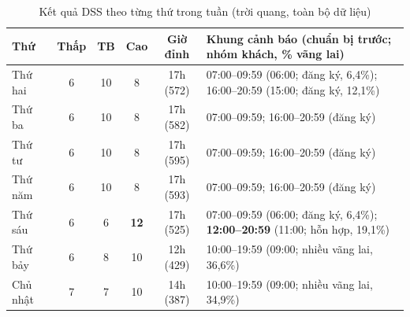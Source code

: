 \begin{table}[H]
\centering
\caption{Kết quả DSS theo từng thứ trong tuần (trời quang, toàn bộ dữ liệu)}
\label{tab:weekdays}
\small
\begin{tabularx}{\textwidth}{|l|c|c|c|c|X|}
\hline
\textbf{Thứ} & \textbf{Thấp} & \textbf{TB} & \textbf{Cao} & \textbf{Giờ đỉnh} & \textbf{Khung cảnh báo (chuẩn bị trước; nhóm khách, \% vãng lai)} \\ \hline
Thứ hai & 6 & 10 & 8 & 17h (572) & 07:00--09:59 (06:00; đăng ký, 6,4\%); 16:00--20:59 (15:00; đăng ký, 12,1\%) \\ \hline
Thứ ba & 6 & 10 & 8 & 17h (582) & 07:00--09:59; 16:00--20:59 (đăng ký) \\ \hline
Thứ tư & 6 & 10 & 8 & 17h (595) & 07:00--09:59; 16:00--20:59 (đăng ký) \\ \hline
Thứ năm & 6 & 10 & 8 & 17h (593) & 07:00--09:59; 16:00--20:59 (đăng ký) \\ \hline
Thứ sáu & 6 & 6 & \textbf{12} & 17h (525) & 07:00--09:59 (06:00; đăng ký, 6,4\%); \textbf{12:00--20:59} (11:00; hỗn hợp, 19,1\%) \\ \hline
Thứ bảy & 6 & 8 & 10 & 12h (429) & 10:00--19:59 (09:00; nhiều vãng lai, 36,6\%) \\ \hline
Chủ nhật & 7 & 7 & 10 & 14h (387) & 10:00--19:59 (09:00; nhiều vãng lai, 34,9\%) \\ \hline
\end{tabularx}
\end{table}

